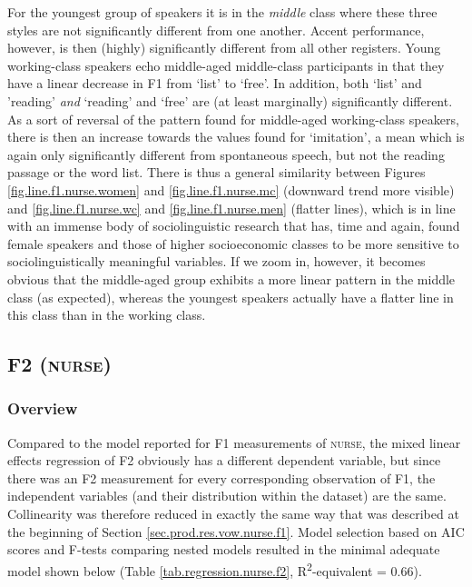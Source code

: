For the youngest group of speakers it is in the \emph{middle} class where these three styles are not significantly different from one another.
Accent performance, however, is then (highly) significantly different from all other registers.
Young working-class speakers echo middle-aged middle-class participants in that they have a linear decrease in F1 from `list' to `free'.
In addition, both `list' and 'reading' \emph{and} `reading' and `free' are (at least marginally) significantly different.
As a sort of reversal of the pattern found for middle-aged working-class speakers, there is then an increase towards the values found for `imitation', a mean which is again only significantly different from spontaneous speech, but not the reading passage or the word list.
There is thus a general similarity between Figures \ref{fig.line.f1.nurse.women} and \ref{fig.line.f1.nurse.mc} (downward trend more visible) and \ref{fig.line.f1.nurse.wc} and \ref{fig.line.f1.nurse.men} (flatter lines), which is in line with an immense body of sociolinguistic research that has, time and again, found female speakers and those of higher socioeconomic classes to be more sensitive to sociolinguistically meaningful variables.
If we zoom in, however, it becomes obvious that the middle-aged group exhibits a more linear pattern in the middle class (as expected), whereas the youngest speakers actually have a flatter line in this class than in the working class.

\subsection{F2 (\textrm{\textsc{nurse}})}
\label{sec.prod.res.vow.nurse.f2}

\subsubsection{Overview}
\label{sec.prod.res.vow.nurse.f2.overview}

Compared to the model reported for F1 measurements of \textsc{nurse}, the mixed linear effects regression of F2 obviously has a different dependent variable, but since there was an F2 measurement for every corresponding observation of F1, the independent variables (and their distribution within the dataset) are the same.
Collinearity was therefore reduced in exactly the same way that was described at the beginning of Section \ref{sec.prod.res.vow.nurse.f1}.
Model selection based on AIC scores and F-tests comparing nested models resulted in the minimal adequate model shown below (Table \ref{tab.regression.nurse.f2}, R\textsuperscript{2}-equivalent = 0.66).

